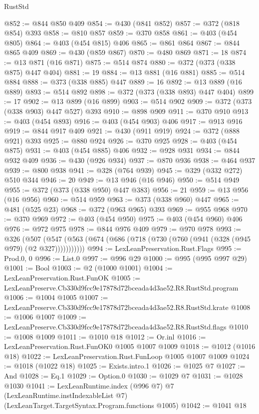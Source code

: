 \begin{lexlean}{RustStd}
\begin{coremodule}
@852 := @844 @850 @409
@854 := @430 (@841 @852)
@857 := @372 (@818 @854) @393
@858 := @810 @857
@859 := @370 @858
@861 := @403 (@454 @805)
@864 := @403 (@454 @815) @406
@865 := @861 @864
@867 := @844 @865 @409
@869 := @430 (@859 @867)
@870 := @480 @869
@871 := 18
@874 := @13 @871 (@16 @871)
@875 := @514 @874
@880 := @372 (@373 (@338 @875) @447 @404)
@881 := 19
@884 := @13 @881 (@16 @881)
@885 := @514 @884
@888 := @373 (@338 @885) @447
@889 := 16
@892 := @13 @889 (@16 @889)
@893 := @514 @892
@898 := @372 (@373 (@338 @893) @447 @404)
@899 := 17
@902 := @13 @899 (@16 @899)
@903 := @514 @902
@909 := @372 (@373 (@338 @903) @447 @527) @393
@910 := @898 @909
@911 := @370 @910
@913 := @403 (@454 @893)
@916 := @403 (@454 @903) @406
@917 := @913 @916
@919 := @844 @917 @409
@921 := @430 (@911 @919)
@924 := @372 (@888 @921) @393
@925 := @880 @924
@926 := @370 @925
@928 := @403 (@454 @875)
@931 := @403 (@454 @885) @406
@932 := @928 @931
@934 := @844 @932 @409
@936 := @430 (@926 @934)
@937 := @870 @936
@938 := @464 @937
@939 := @800 @938
@941 := @328 (@764 @939)
@945 := @329 (@332 @272) @510 @344
@946 := 20
@949 := @13 @946 (@16 @946)
@950 := @514 @949
@955 := @372 (@373 (@338 @950) @447 @383)
@956 := 21
@959 := @13 @956 (@16 @956)
@960 := @514 @959
@963 := @373 (@338 @960) @447
@965 := @481 (@525 @23)
@968 := @372 (@963 @965) @393
@969 := @955 @968
@970 := @370 @969
@972 := @403 (@454 @950)
@975 := @403 (@454 @960) @406
@976 := @972 @975
@978 := @844 @976 @409
@979 := @970 @978
@993 := @326
    (@507 (@547 (@563 (@674 (@686 (@718 (@730 (@760 (@941 (@328 (@945 @979) (@2 @327)))))))))))
@994 := LexLeanPreservation.Rust.Flags
@995 := Prod.{0, 0}
@996 := List.{0}
@997 := @996 @29
@1000 := @995 (@995 @997 @29)
@1001 := Bool
@1003 := @2 (@1000 @1001)
@1004 := LexLeanPreservation.Rust.FunOK
@1005 := LexLeanPreserve.Cb330d9fcc9e17878d72bceada4d3ae52.R8.RustStd.program
@1006 := @1004 @1005
@1007 := LexLeanPreserve.Cb330d9fcc9e17878d72bceada4d3ae52.R8.RustStd.krate
@1008 := @1006 @1007
@1009 := LexLeanPreserve.Cb330d9fcc9e17878d72bceada4d3ae52.R8.RustStd.flags
@1010 := @1008 @1009
@1011 := @1010 @18
@1012 := Or.inl
@1016 := LexLeanPreservation.Rust.FunOK0 @1005 @1007 @1009
@1018 := @1012 (@1016 @18)
@1022 := LexLeanPreservation.Rust.FunLoop @1005 @1007 @1009
@1024 := @1018 (@1022 @18)
@1025 := Exists.intro.{1}
@1026 := @1025 @7
@1027 := And
@1028 := Eq.{1}
@1029 := Option.{0}
@1030 := @1029 @7
@1031 := @1028 @1030
@1041 := LexLeanRuntime.index
    (@996 @7)
    @7
    (LexLeanRuntime.instIndexableList @7)
    (LexLeanTarget.TargetSyntax.Program.functions @1005)
@1042 := @1041 @18

\end{coremodule}
\end{lexlean}
